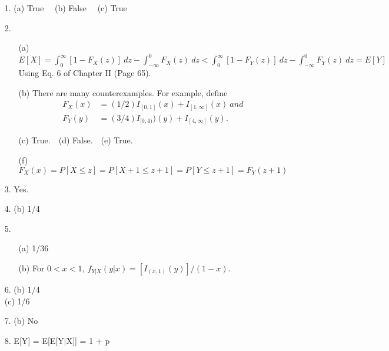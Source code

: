 \begin{enumerate}
	\item[1.] (a) True $\quad$(b) False $\quad$(c) True 
	
	\item[2.] \begin{enumerate}
		
		\item[(a)] $\displaystyle E[X]=\int_0^\infty [1-F_X(z)]\ dz - \int_{-\infty}^0 F_X(z)\ dz < \int_0^\infty [1-F_Y(z)]\ dz - \int_{-\infty}^0 F_Y(z)\ dz = E[Y]$ \\ 
		Using Eq. 6 of Chapter II (Page 65).
		
		\item[(b)] There are many counterexamples.  For example, define  
		\begin{align*} F_X(x) &= (1/2)I_{[0,1]}(x) + I_{[1,\infty]}(x)\ and \\ 
		F_Y(y) &= (3/4)I_{[0,4)})(y) + I_{[4,\infty]}(y).
		\end{align*} 
		
		\item[(c)] True.$\quad$(d) False.$\quad$(e) True.
		
		\item[(f)] $F_X(x) = P[X\le z] = P[X+1\le z+1] = P[Y\le z+1] = F_Y(z+1)$
	\end{enumerate}
	
	\item[3.] Yes.
	
	\item[4.] (b) 1/4
	
	\item[5.] \begin{enumerate}
		
		\item[(a)] 1/36
		
		\item[(b)] For $0< x< 1,\ f_{Y\vert X}(y\vert x) = [I_{(x,1)}(y)]/(1-x).$

		\end{enumerate} 
	
	\item[6.] (b) 1/4 \\
	(c) 1/6
	
	\item[7.] (b) No
	
	\item[8.] E[Y] = E[E[Y$\vert$X]] = 1 + p
	

\end{enumerate}
